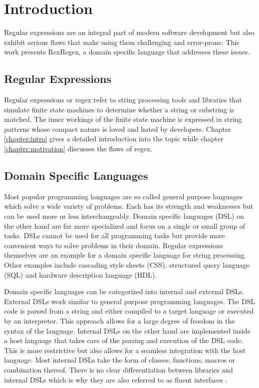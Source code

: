 \chapter{Introduction}

Regular expressions are an integral part of modern software development but also exhibit serious flaws that make using them challenging and error-prone. This work presents RexRegex, a domain specific language that addresses these issues.

\section{Regular Expressions}

Regular expressions or regex refer to string processing tools and libraries that simulate finite state machines to determine whether a string or substring is matched. The inner workings of the finite state machine is expressed in string patterns whose compact nature is loved and hated by developers. Chapter \ref{chapter:intro} gives a detailed introduction into the topic while chapter \ref{chapter:motivation} discusses the flaws of regex.

\section{Domain Specific Languages}

Most popular programming languages are so called general purpose languages which solve a wide variety of problems. Each has its strength and weaknesses but can be used more or less interchangeably. Domain specific languages (DSL)  on the other hand are far more specialized and focus on a single or small group of tasks. DSLs cannot be used for all programming tasks but provide more convenient ways to solve problems in their domain. Regular expressions themselves are an example for a domain specific language for string processing. Other examples include cascading style sheets (CSS), structured query language (SQL) and hardware description language (HDL).

Domain specific languages can be categorized into internal and external DSLs. External DSLs work similar to general purpose programming languages. The DSL code is parsed from a string and either compiled to a target language or executed by an interpreter. This approach allows for a large degree of freedom in the syntax of the language. Internal DSLs on the other hand are implemented inside a host language that takes care of the parsing and execution of the DSL code. This is more restrictive but also allows for a seamless integration with the host language. Most internal DSLs take the form of classes, functions, macros or combination thereof. There is no clear differentiation between libraries and internal DSLs which is why they are also referred to as fluent interfaces \cite{FluentInterfacesFowler}.

